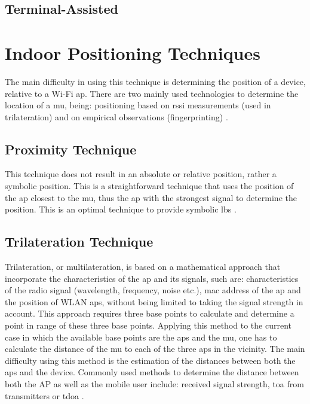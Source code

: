 \subsection{Terminal-Assisted}
\section{Indoor Positioning Techniques}
The main difficulty in using this technique is determining the position of a device, relative to a Wi-Fi \acrfull{ap}. There are two mainly used technologies to determine the location of a \acrfull{mu}, being: positioning based on \acrshort{rssi} measurements (used in trilateration) and on empirical observations (fingerprinting) \cite{Frank2009}.
\subsection{Proximity Technique}
This technique does not result in an absolute or relative position, rather a symbolic position. This is a straightforward technique that uses the position of the \acrshort{ap} closest to the \acrlong{mu}, thus the \acrlong{ap} with the strongest signal to determine the position. This is an optimal technique to provide symbolic \acrlong{lbs} \cite{Sakpere2017}.
\subsection{Trilateration Technique}
Trilateration, or multilateration, is based on a mathematical approach that incorporate the characteristics of the \acrshort{ap} and its signals, such are: characteristics of the radio signal (wavelength, frequency, noise etc.), \acrfull{mac} address of the \acrlong{ap} and the position of WLAN \acrshort{ap}s, without being limited to taking the signal strength in account. This approach requires three base points to calculate and determine a point in range of these three base points. Applying this method to the current case in which the available base points are the \acrshort{ap}s and the \acrshort{mu}, one has to calculate the distance of the \acrlong{mu} to each of the three \acrshort{ap}s in the vicinity. The main difficulty using this method is the estimation of the distances between both the \acrshort{ap}s and the device. Commonly used methods to determine the distance between both the AP as well as the mobile user include: received signal strength, \acrfull{toa} from transmitters or \acrfull{tdoa} \cite[p.~1]{Shchekotov}.

